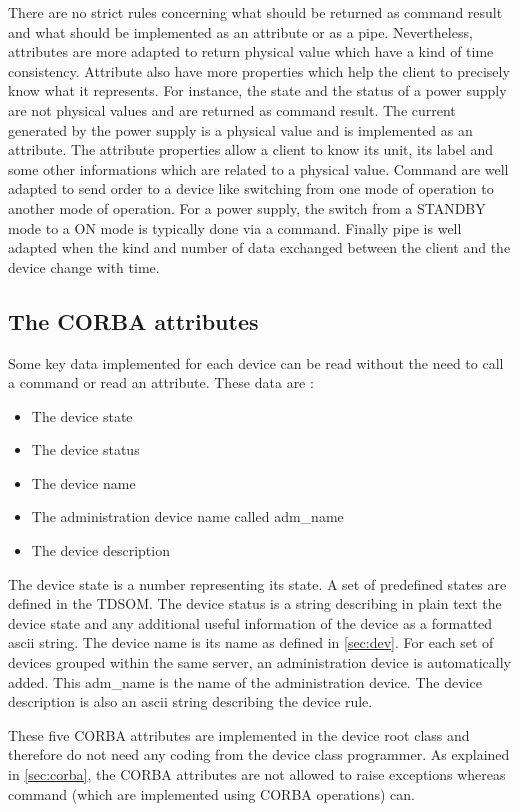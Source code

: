 There are no strict rules concerning what should be returned as command
result and what should be implemented as an attribute or as a pipe.
Nevertheless, attributes are more adapted to return physical value
which have a kind of time consistency. Attribute also have more properties
which help the client to precisely know what it represents. For instance,
the state and the status of a power supply are not physical values
and are returned as command result. The current generated by the power
supply is a physical value and is implemented as an attribute. The
attribute properties allow a client to know its unit, its label and
some other informations which are related to a physical value. Command
are well adapted to send order to a device like switching from one
mode of operation to another mode of operation. For a power supply,
the switch from a STANDBY mode to a ON mode is typically done via
a command. Finally pipe is well adapted when the kind and number of
data exchanged between the client and the device change with time.


\subsection{The CORBA attributes}

Some key data implemented for each device can be read without the
need to call a command or read an attribute. These data are :
\begin{itemize}
\item The device state
\item The device status
\item The device name
\item The administration device name called adm\_name
\item The device description
\end{itemize}
The device state is a number representing its state. A set of predefined
states are defined in the TDSOM. The device status is a string describing
in plain text the device state and any additional useful information
of the device as a formatted ascii string. The device name is its
name as defined in \ref{sec:dev}. For each set of devices grouped
within the same server, an administration device is automatically
added. This adm\_name is the name of the administration device. The
device description is also an ascii string describing the device rule.

These five CORBA attributes are implemented in the device root class
and therefore do not need any coding from the device class programmer.
As explained in \ref{sec:corba}, the CORBA attributes are not allowed
to raise exceptions whereas command (which are implemented using CORBA
operations) can.


